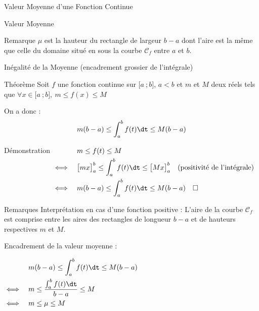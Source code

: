 \documentclass{cours}
\begin{document}
\begin{Gpartie}{Valeur Moyenne d'une Fonction Continue}
\begin{Spartie}{Valeur Moyenne}
\begin{SSpartie}{Remarque}
                $\mu$ est la hauteur du rectangle de largeur $b-a$ dont l'aire est la même que celle du domaine situé en sous la courbe $\mathcal{C}_f$ entre $a$ et $b$.
            \end{SSpartie}
        \end{Spartie}
        \pagebreak
        \begin{Spartie}{Inégalité de la Moyenne (encadrement \og grossier \fg{} de l'intégrale)} 
            \begin{SSpartie}{Théorème} 
                Soit $f$ une fonction continue sur $\big[a~;b\big]$, $a<b$ et $m$ et $M$ deux réels tels que $\forall x\in\big[a~;b\big],~m\leq f(x)\leq M$

                On a donc : \[m(b-a)\leq\int_a^b f(t)\dt\leq M(b-a)\]
                \begin{SSSpartie}{Démonstration} 
                    $\begin{aligned}[t]
                        &\quad m\leq f(t)\leq M \\
                        \iff&\quad\big[mx\big]_a^b\leq\int_a^b f(t)\dt\leq \big[Mx\big]_a^b\quad\text{(positivité de l'intégrale)} \\
                        \iff&\quad m(b-a)\leq\int_a^b f(t)\dt \leq M(b-a)\quad\square
                    \end{aligned}$
                \end{SSSpartie}
            \end{SSpartie}
            \begin{SSpartie}{Remarques} 
                Interprétation en cas d'une fonction positive : L'aire de la courbe $\mathcal{C}_f$ est comprise entre les aires des rectangles de longueur $b-a$ et de hauteurs respectives $m$ et $M$.
                
                Encadrement de la valeur moyenne :

                $\begin{aligned}[t]
                    &\quad m(b-a)\leq\int_a^b f(t)\dt \leq M(b-a) \\
                    \iff&\quad m\leq\frac{\int_a^b f(t)\dt}{b-a}\leq M \\
                    \iff&\quad m\leq\mu\leq M
                \end{aligned}$
            \end{SSpartie}
        \end{Spartie}
    \end{Gpartie}
    \pagebreak
\end{document}
